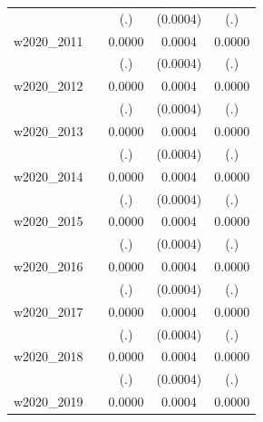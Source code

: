 \begin{table}[htbp]
\begin{tabular}{l*{4}{c}}
            &                     &         (.)         &    (0.0004)         &         (.)         \\
[1em]
w2020\_2011  &                     &      0.0000         &      0.0004         &      0.0000         \\
            &                     &         (.)         &    (0.0004)         &         (.)         \\
[1em]
w2020\_2012  &                     &      0.0000         &      0.0004         &      0.0000         \\
            &                     &         (.)         &    (0.0004)         &         (.)         \\
[1em]
w2020\_2013  &                     &      0.0000         &      0.0004         &      0.0000         \\
            &                     &         (.)         &    (0.0004)         &         (.)         \\
[1em]
w2020\_2014  &                     &      0.0000         &      0.0004         &      0.0000         \\
            &                     &         (.)         &    (0.0004)         &         (.)         \\
[1em]
w2020\_2015  &                     &      0.0000         &      0.0004         &      0.0000         \\
            &                     &         (.)         &    (0.0004)         &         (.)         \\
[1em]
w2020\_2016  &                     &      0.0000         &      0.0004         &      0.0000         \\
            &                     &         (.)         &    (0.0004)         &         (.)         \\
[1em]
w2020\_2017  &                     &      0.0000         &      0.0004         &      0.0000         \\
            &                     &         (.)         &    (0.0004)         &         (.)         \\
[1em]
w2020\_2018  &                     &      0.0000         &      0.0004         &      0.0000         \\
            &                     &         (.)         &    (0.0004)         &         (.)         \\
[1em]
w2020\_2019  &                     &      0.0000         &      0.0004         &      0.0000         \\

\end{tabular}
\end{table}
